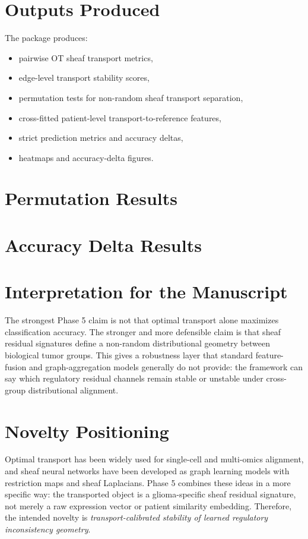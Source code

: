 \documentclass[11pt]{article}
\begin{document}
\section{Outputs Produced}
The package produces:
\begin{itemize}[leftmargin=2em]
    \item pairwise OT sheaf transport metrics,
    \item edge-level transport stability scores,
    \item permutation tests for non-random sheaf transport separation,
    \item cross-fitted patient-level transport-to-reference features,
    \item strict prediction metrics and accuracy deltas,
    \item heatmaps and accuracy-delta figures.
\end{itemize}

\section{Permutation Results}


\section{Accuracy Delta Results}


\section{Interpretation for the Manuscript}
The strongest Phase 5 claim is not that optimal transport alone maximizes classification accuracy.  The stronger and more defensible claim is that sheaf residual signatures define a non-random distributional geometry between biological tumor groups.  This gives a robustness layer that standard feature-fusion and graph-aggregation models generally do not provide: the framework can say which regulatory residual channels remain stable or unstable under cross-group distributional alignment.

\section{Novelty Positioning}
Optimal transport has been widely used for single-cell and multi-omics alignment, and sheaf neural networks have been developed as graph learning models with restriction maps and sheaf Laplacians.  Phase 5 combines these ideas in a more specific way: the transported object is a glioma-specific sheaf residual signature, not merely a raw expression vector or patient similarity embedding.  Therefore, the intended novelty is \emph{transport-calibrated stability of learned regulatory inconsistency geometry}.
\end{document}
